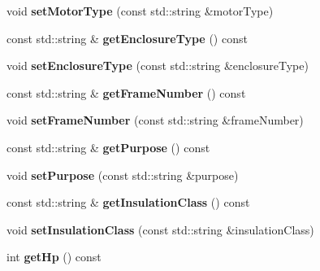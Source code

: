 \begin{DoxyCompactItemize}
\item 
\mbox{\label{class_motor_data_a3b3f78a7e8e45a94df538d7663d56256}} 
void {\bfseries set\+Motor\+Type} (const std\+::string \&motor\+Type)
\item 
\mbox{\label{class_motor_data_a4272913727c7a643a199f95dd6c0ce25}} 
const std\+::string \& {\bfseries get\+Enclosure\+Type} () const
\item 
\mbox{\label{class_motor_data_a7a6a1b8600a9c7481b32bf962edcef99}} 
void {\bfseries set\+Enclosure\+Type} (const std\+::string \&enclosure\+Type)
\item 
\mbox{\label{class_motor_data_a641faa7438d7f06d3d622f7f86d09481}} 
const std\+::string \& {\bfseries get\+Frame\+Number} () const
\item 
\mbox{\label{class_motor_data_afea21a449177b09087441c58f4b81a84}} 
void {\bfseries set\+Frame\+Number} (const std\+::string \&frame\+Number)
\item 
\mbox{\label{class_motor_data_ab2f4bd7d472dfa92850a542aefbdcd3c}} 
const std\+::string \& {\bfseries get\+Purpose} () const
\item 
\mbox{\label{class_motor_data_a1c1c332dc9d549a1a50a0e2d93ec413a}} 
void {\bfseries set\+Purpose} (const std\+::string \&purpose)
\item 
\mbox{\label{class_motor_data_aae4ce578d5c7517187fba692c8b93308}} 
const std\+::string \& {\bfseries get\+Insulation\+Class} () const
\item 
\mbox{\label{class_motor_data_a85cf8f4df6cacf6c637a3764a8a09dbf}} 
void {\bfseries set\+Insulation\+Class} (const std\+::string \&insulation\+Class)
\item 
\mbox{\label{class_motor_data_a4815d7d856deb37f89ed415ae8997948}} 
int {\bfseries get\+Hp} () const
\item 
\mbox{\label{class_motor_data_ac27f7062a26c94e29c25219883aa2915}} 

\end{DoxyCompactItemize}
